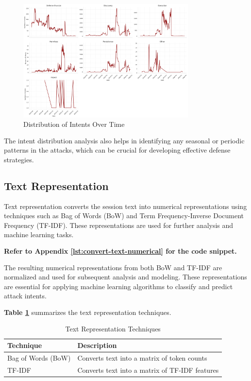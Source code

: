         \begin{figure}[h]
            \centering
            \includegraphics[width=0.8\textwidth]{../figures/plots/section1/intents_over_timestamps.png}
            \caption{Distribution of Intents Over Time}
            \label{fig:intent-distribution}
        \end{figure}

        The intent distribution analysis also helps in identifying any seasonal or periodic patterns in the attacks, which can be crucial for developing effective defense strategies.

    \subsection{Text Representation}
    
        Text representation converts the session text into numerical representations using techniques such as Bag of Words (BoW) and Term Frequency-Inverse Document Frequency (TF-IDF). These representations are used for further analysis and machine learning tasks.
        
        \textbf{Refer to Appendix \ref{lst:convert-text-numerical} for the code snippet.}

        The resulting numerical representations from both BoW and TF-IDF are normalized and used for subsequent analysis and modeling. These representations are essential for applying machine learning algorithms to classify and predict attack intents.

        \textbf{Table \ref{tab:text-representation}} summarizes the text representation techniques.

        \begin{table}[h]
            \centering
            \caption{Text Representation Techniques}
            \label{tab:text-representation}
            \begin{tabular}{|l|l|}
                \hline
                \textbf{Technique} & \textbf{Description} \\ \hline
                Bag of Words (BoW) & Converts text into a matrix of token counts \\ \hline
                TF-IDF & Converts text into a matrix of TF-IDF features \\ \hline
            \end{tabular}
        \end{table}

